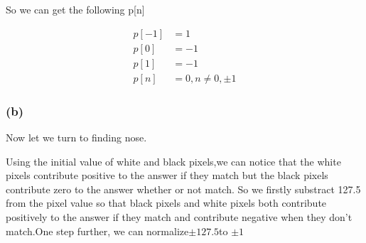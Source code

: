 \documentclass{article}
\begin{document}
So we can get the following p[n]
\begin{center}
    \begin{align*}
        p[-1] &= 1\\
        p[0] &= -1\\
        p[1] &= -1\\
        p[n] &= 0 , n \not =0,\pm 1
    \end{align*}
\end{center}

\subsubsection*{(b)}
Now let we turn to finding nose.\par
Using the initial value of white and black pixels,we can 
notice that the white pixels contribute positive to the answer if they match 
but the black pixels contribute zero to the answer whether or not match.
So we firstly substract 127.5 from the pixel value so that 
black pixels and white pixels both contribute positively to the answer if they match 
and contribute negative when they don't match.One step further,
we can normalize$\pm 127.5$to $\pm 1$\par
\end{document}

